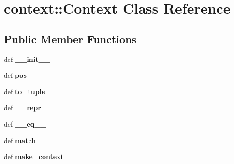 \hypertarget{classcontext_1_1Context}{
\section{context::Context Class Reference}
\label{classcontext_1_1Context}
}
\subsection*{Public Member Functions}
\begin{DoxyCompactItemize}
\item 
\hypertarget{classcontext_1_1Context_a45331427ba3068871837515e241bbc15}{
def {\bfseries \_\-\_\-init\_\-\_\-}}
\label{classcontext_1_1Context_a45331427ba3068871837515e241bbc15}

\item 
\hypertarget{classcontext_1_1Context_a614cdfde821d83549eb18b3db26f6160}{
def {\bfseries pos}}
\label{classcontext_1_1Context_a614cdfde821d83549eb18b3db26f6160}

\item 
\hypertarget{classcontext_1_1Context_a0d10b0f9dae71ae73112cdf0f82fc0b3}{
def {\bfseries to\_\-tuple}}
\label{classcontext_1_1Context_a0d10b0f9dae71ae73112cdf0f82fc0b3}

\item 
\hypertarget{classcontext_1_1Context_afbcaecfab5c6553ee9f206982556e22c}{
def {\bfseries \_\-\_\-repr\_\-\_\-}}
\label{classcontext_1_1Context_afbcaecfab5c6553ee9f206982556e22c}

\item 
\hypertarget{classcontext_1_1Context_a4bf737305e5d500a374c83e89503d32e}{
def {\bfseries \_\-\_\-eq\_\-\_\-}}
\label{classcontext_1_1Context_a4bf737305e5d500a374c83e89503d32e}

\item 
\hypertarget{classcontext_1_1Context_a24a388dcf7c90cbc7f3289b3e237f20f}{
def {\bfseries match}}
\label{classcontext_1_1Context_a24a388dcf7c90cbc7f3289b3e237f20f}

\item 
\hypertarget{classcontext_1_1Context_a5939d15112372def8ddea3a67695fbff}{
def {\bfseries make\_\-context}}
\label{classcontext_1_1Context_a5939d15112372def8ddea3a67695fbff}

\end{DoxyCompactItemize}
